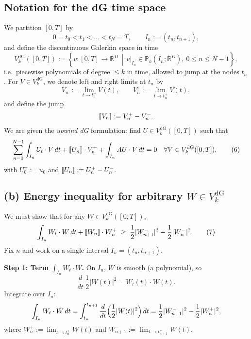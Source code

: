 \subsection*{Notation for the dG time space}
We partition $[0,T]$ by
\[
    0 = t_0 < t_1 < \dots < t_N = T,\qquad I_n := (t_n,t_{n+1}),
\]
and define the discontinuous Galerkin space in time
\[
    V_k^{\mathrm{dG}}([0,T])
    :=
    \left\{
    v : [0,T]\to\mathbb{R}^D \,\middle|\,
    v|_{I_n} \in \mathbb{P}_k(I_n;\mathbb{R}^D),\ 0\le n\le N-1
    \right\},
\]
i.e.\ piecewise polynomials of degree $\le k$ in time, allowed to jump at the nodes $t_n$.
For $V\in V_k^{\mathrm{dG}}$, we denote left and right limits at $t_n$ by
\[
    V_n^- := \lim_{t\to t_n^-} V(t),\qquad
    V_n^+ := \lim_{t\to t_n^+} V(t),
\]
and define the jump
\[
    \left[\!\left[ V_n \right]\!\right] := V_n^+ - V_n^-.
\]
We are given the \emph{upwind dG} formulation: find
$U\in V_k^{\mathrm{dG}}([0,T])$ such that
\[
    \sum_{n=0}^{N-1} \int_{I_n} U_t \cdot V\,dt
    + \left[\!\left[ U_n \right]\!\right]\cdot V_n^+
    + \int_{I_n} A U\cdot V\,dt
    = 0
    \quad\forall V\in V_k^{\mathrm{dG}}([0,T]), \tag{6}
\]
with $U_0^- := u_0$ and $\left[\!\left[ U_n \right]\!\right] := U_n^+ - U_n^-$.
\subsection*{(b) Energy inequality for arbitrary $W\in V_k^{\mathrm{dG}}$}
We must show that for any $W\in V_k^{\mathrm{dG}}([0,T])$,
\[
    \int_{I_n} W_t\cdot W\,dt
    + \left[\!\left[ W_n \right]\!\right]\cdot W_n^+
    \;\ge\;
    \frac12 |W_{n+1}^-|^2 - \frac12 |W_n^-|^2.
    \tag{7}
\]
Fix $n$ and work on a single interval $I_n=(t_n,t_{n+1})$.

\textbf{Step 1: Term $\displaystyle\int_{I_n} W_t\cdot W$.}
On $I_n$, $W$ is smooth (a polynomial), so
\[
    \frac{d}{dt}\,\frac12 |W(t)|^2 = W_t(t)\cdot W(t).
\]
Integrate over $I_n$:
\[
    \int_{I_n} W_t\cdot W\,dt
    = \int_{t_n}^{t_{n+1}} \frac{d}{dt}\Bigl(\frac12 |W(t)|^2\Bigr)\,dt
    = \frac12 |W_{n+1}^-|^2 - \frac12 |W_n^+|^2,
\]
where $W_n^+ := \lim_{t\to t_n^+} W(t)$ and $W_{n+1}^- := \lim_{t\to t_{n+1}^-} W(t)$.

